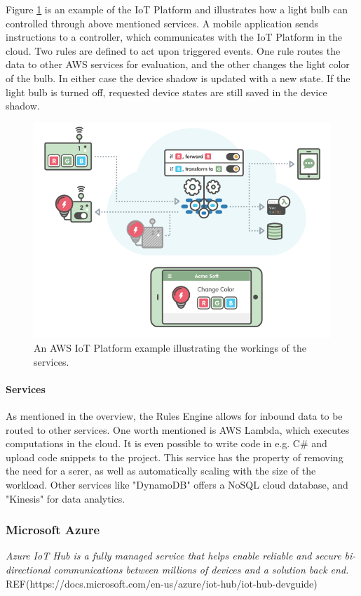 Figure \ref{fig:aws:example} is an example of the IoT Platform and illustrates how a light bulb can controlled through above mentioned services. A mobile application sends instructions to a controller, which communicates with the IoT Platform in the cloud. Two rules are defined to act upon triggered events. One rule routes the data to other AWS services for evaluation, and the other changes the light color of the bulb. In either case the device shadow is updated with a new state. If the light bulb is turned off, requested device states are still saved in the device shadow.  
\begin{figure}[h!]
	\centering
	\includegraphics[width=\textwidth]{figures/aws/example.png}
	\caption{An AWS IoT Platform example illustrating the workings of the services.}
	\label{fig:aws:example}
\end{figure}

\paragraph{Services}
As mentioned in the overview, the Rules Engine allows for inbound data to be routed to other services. One worth mentioned is AWS Lambda, which executes computations in the cloud. It is even possible to write code in e.g. C\# and upload code snippets to the project. This service has the property of removing the need for a serer, as well as automatically scaling with the size of the workload. Other services like "DynamoDB" offers a NoSQL cloud database, and "Kinesis" for data analytics.  

\subsubsection{Microsoft Azure}
\textit{Azure IoT Hub is a fully managed service that helps enable reliable and secure bi-directional communications between millions of devices and a solution back end.} REF(https://docs.microsoft.com/en-us/azure/iot-hub/iot-hub-devguide)


